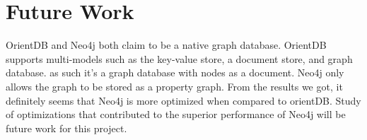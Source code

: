 \section{Future Work}
OrientDB and Neo4j both claim to be a native graph database. OrientDB supports multi-models such as the key-value store, a document store, and graph database. as such it's a graph database with nodes as a document. Neo4j only allows the graph to be stored as a property graph. From the results we got, it definitely seems that Neo4j is more optimized when compared to orientDB. Study of optimizations that contributed to the superior performance of Neo4j will be future work for this project.